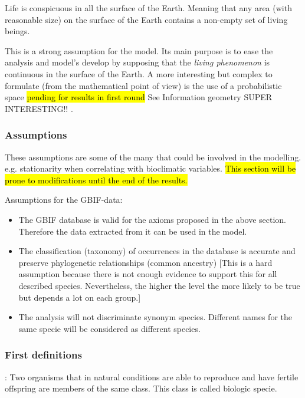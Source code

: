 \begin{axiom}
Life is conspicuous in all the surface of the Earth. Meaning that any area (with reasonable size) on the surface of the Earth contains a non-empty set of living beings.
\end{axiom}
This is a strong assumption for the model. Its main purpose is to ease the analysis and model's develop by supposing that the {\em living phenomenon} is continuous in the surface of the Earth. A more interesting but complex to formulate (from the mathematical point of view) is the use of a probabilistic space \hl{pending for results in first round} See \citep{amari_infogeometry} Information geometry SUPER INTERESTING!! .


\subsubsection{Assumptions}
These assumptions are some of the many that could be involved in the modelling. 
e.g. stationarity when correlating with bioclimatic variables.
\hl{This section will be prone to modifications until the end of the results.}
 
Assumptions for the GBIF-data:
\begin{itemize}
\item The GBIF database is valid for the axioms proposed in the above section. Therefore the data extracted from it can be used in the model.

\item The classification (taxonomy) of occurrences in the database is accurate and preserve phylogenetic relationships (common ancestry) [This is a hard assumption because there is not enough evidence to support this for all described species. Nevertheless,  the higher the level the more likely to be true but depends a lot on each group.]

\item The analysis will not discriminate synonym species. Different names for the same specie will be considered as different species.
\end{itemize}


\subsubsection{First definitions}
\begin{definition}:
Two organisms that in natural conditions are able to reproduce and have fertile offspring are members of the same class. This class is called biologic specie.
\end{definition}


